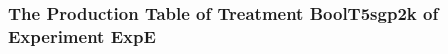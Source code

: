  \begin{frame}
 \fontsize{8pt}{9pt}\selectfont
 \frametitle{ The Production Table of Treatment BoolT5sgp2k of Experiment ExpE }

 \label{ExpEGrammarTable008.tex}  
 \end{frame}

